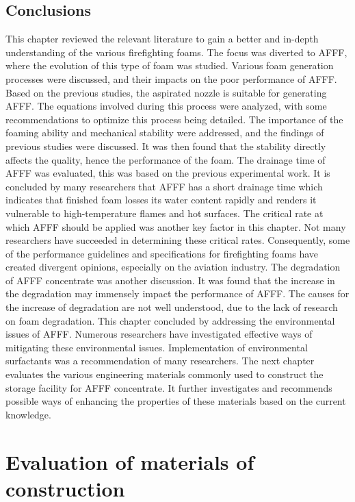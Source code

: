 \documentclass[12pt]{report}
\begin{document}
\section{Conclusions}
This chapter reviewed the relevant literature to gain a better and in-depth understanding of the various firefighting foams. The focus was diverted to AFFF, where the evolution of this type of foam was studied. Various foam generation processes were discussed, and their impacts on the poor performance of AFFF. Based on the previous studies, the aspirated nozzle is suitable for generating AFFF. The equations involved during this process were analyzed, with some recommendations to optimize this process being detailed. The importance of the foaming ability and mechanical stability were addressed, and the findings of previous studies were discussed. It was then found that the stability directly affects the quality, hence the performance of the foam.
The drainage time of AFFF was evaluated, this was based on the previous experimental work. It is concluded by many researchers that AFFF has a short drainage time which indicates that finished foam losses its water content rapidly and renders it vulnerable to high-temperature flames and hot surfaces.
The critical rate at which AFFF should be applied was another key factor in this chapter. Not many researchers have succeeded in determining these critical rates. Consequently, some of the performance guidelines and specifications for firefighting foams have created divergent opinions, especially on the aviation industry. The degradation of AFFF concentrate was another discussion. It was found that the increase in the degradation may immensely impact the performance of AFFF. The causes for the increase of degradation are not well understood, due to the lack of research on foam degradation. This chapter concluded by addressing the environmental issues of AFFF. Numerous researchers have investigated effective ways of mitigating these environmental issues. Implementation of environmental surfactants was a recommendation of many researchers.
The next chapter evaluates the various engineering materials commonly used to construct the storage facility for AFFF concentrate. It further investigates and recommends possible ways of enhancing the properties of these materials based on the current knowledge.


\chapter{Evaluation of materials of construction}
\end{document}
